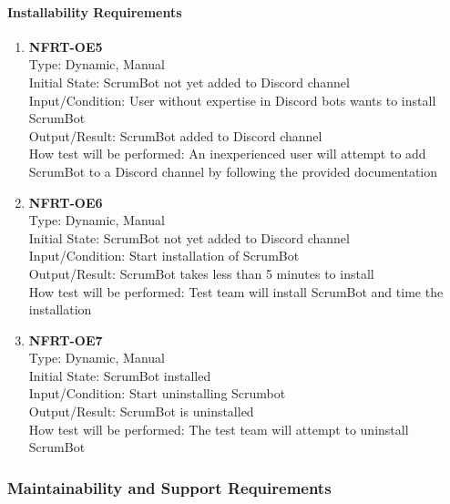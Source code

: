 \documentclass[12pt, titlepage]{article}
\begin{document}
\paragraph{Installability Requirements}
\begin{enumerate}

\item{\textbf{NFRT-OE5}}\\
Type: Dynamic, Manual\\
Initial State: ScrumBot not yet added to Discord channel\\
Input/Condition: User without expertise in Discord bots wants to install ScrumBot\\
Output/Result: ScrumBot added to Discord channel\\
How test will be performed: An inexperienced user will attempt to add ScrumBot to a Discord channel by following the provided documentation

\item{\textbf{NFRT-OE6}}\\
Type: Dynamic, Manual\\
Initial State: ScrumBot not yet added to Discord channel\\
Input/Condition: Start installation of ScrumBot\\
Output/Result: ScrumBot takes less than 5 minutes to install\\
How test will be performed: Test team will install ScrumBot and time the installation

\item{\textbf{NFRT-OE7}}\\
Type: Dynamic, Manual\\
Initial State: ScrumBot installed\\
Input/Condition: Start uninstalling Scrumbot\\
Output/Result: ScrumBot is uninstalled\\
How test will be performed: The test team will attempt to uninstall ScrumBot
\end{enumerate}


\subsubsection{Maintainability and Support Requirements}
\end{document}
